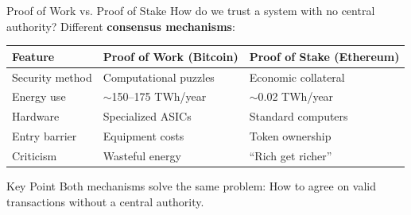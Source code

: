 ﻿\documentclass[aspectratio=169,11pt]{beamer}
\begin{document}
\begin{frame}{Proof of Work vs. Proof of Stake}
How do we trust a system with no central authority? Different \textbf{consensus mechanisms}:

\vspace{0.3em}
\begin{table}[h]
\centering
\footnotesize
\begin{tabular}{@{}p{2.5cm}p{4.5cm}p{4.5cm}@{}}
\toprule
\textbf{Feature} & \textbf{Proof of Work (Bitcoin)} & \textbf{Proof of Stake (Ethereum)} \\
\midrule
Security method & Computational puzzles & Economic collateral \\
Energy use & $\sim$150--175 TWh/year & $\sim$0.02 TWh/year \\
Hardware & Specialized ASICs & Standard computers \\
Entry barrier & Equipment costs & Token ownership \\
Criticism & Wasteful energy & ``Rich get richer'' \\
\bottomrule
\end{tabular}
\end{table}

\begin{alertblock}{Key Point}
Both mechanisms solve the same problem: How to agree on valid transactions without a central authority.
\end{alertblock}
\end{frame}
\end{document}
